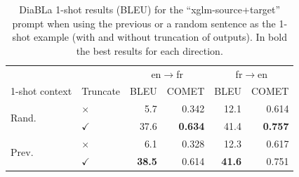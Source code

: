\begin{table}[!ht]
    \centering\small
    \begin{tabular}{llrrrr}
    \toprule
    & & \multicolumn{2}{c}{en$\rightarrow$fr} & \multicolumn{2}{c}{fr$\rightarrow$en} \\
    1-shot context & Truncate & BLEU & COMET & BLEU & COMET \\
    \toprule
    \multirow{2}{*}{Rand.}   & $\times$ &  5.7 & 0.342 & 12.1 & 0.614 \\
    &  $\checkmark$ & 37.6 & \textbf{0.634} & 41.4 & \textbf{0.757} \\
    \midrule
    \multirow{2}{*}{Prev.}   & $\times$ & 6.1 & 0.328 & 12.3 & 0.617 \\
    & $\checkmark$ & \textbf{38.5} & 0.614 & \textbf{41.6} & 0.751 \\
    \bottomrule
    \end{tabular}
    \caption{DiaBLa 1-shot results (BLEU) for the ``xglm-source+target'' prompt when using the previous or a random sentence as the 1-shot example (with and without truncation of outputs). In bold the best results for each direction.}
    \label{tab:diabla-context-results}
\end{table}